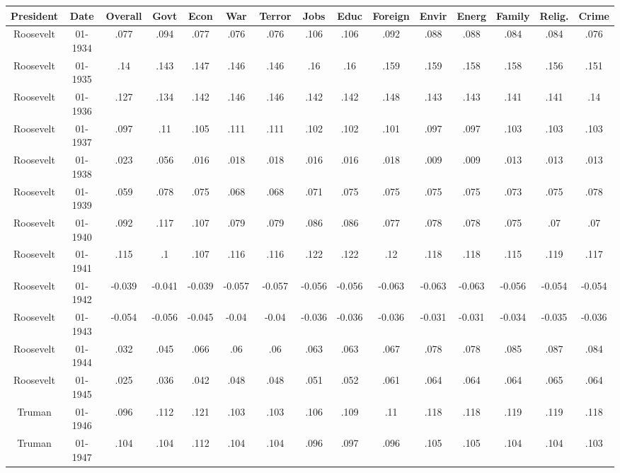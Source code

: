 \begin{sidewaystable}
\begin{singlespace}
\begin{center}
 \begin{tabular}{||c c c c c c c c c c c c c c c||}
 \hline
 President & Date & Overall & Govt & Econ & War & Terror & Jobs & Educ & Foreign & Envir & Energ & Family & Relig. & Crime \\
 \hline\hline
Roosevelt & 01-1934 & .077 & .094 & .077 & .076 & .076 & .106 & .106 & .092 & .088 & .088 & .084 & .084 & .076 \\ 
\hline
Roosevelt & 01-1935 & .14 & .143 & .147 & .146 & .146 & .16 & .16 & .159 & .159 & .158 & .158 & .156 & .151 \\ 
\hline
Roosevelt & 01-1936 & .127 & .134 & .142 & .146 & .146 & .142 & .142 & .148 & .143 & .143 & .141 & .141 & .14 \\ 
\hline
Roosevelt & 01-1937 & .097 & .11 & .105 & .111 & .111 & .102 & .102 & .101 & .097 & .097 & .103 & .103 & .103 \\ 
\hline
Roosevelt & 01-1938 & .023 & .056 & .016 & .018 & .018 & .016 & .016 & .018 & .009 & .009 & .013 & .013 & .013 \\ 
\hline
Roosevelt & 01-1939 & .059 & .078 & .075 & .068 & .068 & .071 & .075 & .075 & .075 & .075 & .073 & .075 & .078 \\ 
\hline
Roosevelt & 01-1940 & .092 & .117 & .107 & .079 & .079 & .086 & .086 & .077 & .078 & .078 & .075 & .07 & .07 \\ 
\hline
Roosevelt & 01-1941 & .115 & .1 & .107 & .116 & .116 & .122 & .122 & .12 & .118 & .118 & .115 & .119 & .117 \\ 
\hline
Roosevelt & 01-1942 & -0.039 & -0.041 & -0.039 & -0.057 & -0.057 & -0.056 & -0.056 & -0.063 & -0.063 & -0.063 & -0.056 & -0.054 & -0.054 \\ 
\hline
Roosevelt & 01-1943 & -0.054 & -0.056 & -0.045 & -0.04 & -0.04 & -0.036 & -0.036 & -0.036 & -0.031 & -0.031 & -0.034 & -0.035 & -0.036 \\ 
\hline
Roosevelt & 01-1944 & .032 & .045 & .066 & .06 & .06 & .063 & .063 & .067 & .078 & .078 & .085 & .087 & .084 \\ 
\hline
Roosevelt & 01-1945 & .025 & .036 & .042 & .048 & .048 & .051 & .052 & .061 & .064 & .064 & .064 & .065 & .064 \\ 
\hline
Truman & 01-1946 & .096 & .112 & .121 & .103 & .103 & .106 & .109 & .11 & .118 & .118 & .119 & .119 & .118 \\ 
\hline
Truman & 01-1947 & .104 & .104 & .112 & .104 & .104 & .096 & .097 & .096 & .105 & .105 & .104 & .104 & .103 \\ 

\end{tabular}
\end{center}
\end{singlespace}
\end{sidewaystable}
